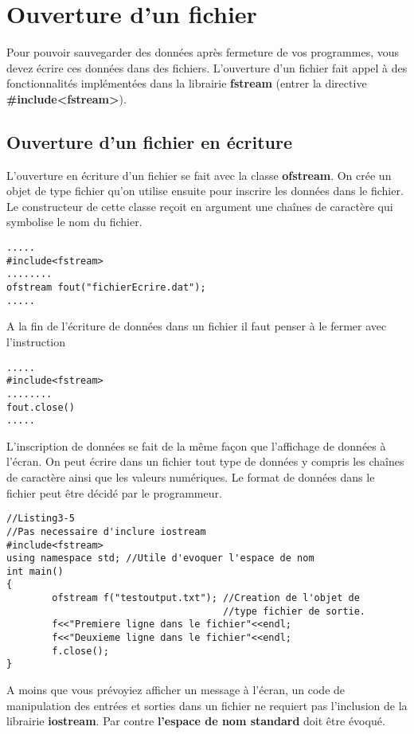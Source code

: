 \documentclass[a4paper, oneside,11pt]{book}
\begin{document}
\section{Ouverture d'un fichier}

Pour pouvoir sauvegarder des donn\'ees apr\`es fermeture de vos programmes, vous devez \'ecrire ces donn\'ees dans des fichiers. L'ouverture d'un fichier fait appel \`a des 
fonctionnalit\'es impl\'ement\'ees dans la librairie \textbf{fstream} (entrer la directive \textbf{\#include<fstream>}).

\subsection{Ouverture d'un fichier en \'ecriture}

L'ouverture  en \'ecriture d'un fichier se fait avec la classe \textbf{ofstream}. On cr\'ee un objet de type fichier qu'on utilise ensuite pour inscrire les donn\'ees dans le fichier.
Le constructeur de cette classe re\c{c}oit en argument une cha\^ines de caract\`ere qui symbolise le nom du fichier.
\begin{lstlisting}
.....
#include<fstream> 
........
ofstream fout("fichierEcrire.dat");
.....
\end{lstlisting}

A la fin de l'\'ecriture de donn\'ees dans un fichier il faut penser \`a le fermer avec l'instruction

\begin{lstlisting}
.....
#include<fstream> 
........
fout.close()
.....
\end{lstlisting}

L'inscription de donn\'ees se fait de la m\^eme fa\c{c}on que l'affichage de donn\'ees \`a l'\'ecran. On peut \'ecrire dans un fichier  tout type de donn\'ees y compris les cha\^ines
de caract\`ere ainsi que les valeurs num\'eriques. Le format de donn\'ees dans le fichier peut \^etre d\'ecid\'e par le programmeur. 

\begin{lstlisting}
//Listing3-5
//Pas necessaire d'inclure iostream
#include<fstream>
using namespace std; //Utile d'evoquer l'espace de nom
int main()
{
        ofstream f("testoutput.txt"); //Creation de l'objet de 
                                      //type fichier de sortie.
        f<<"Premiere ligne dans le fichier"<<endl;
        f<<"Deuxieme ligne dans le fichier"<<endl;
        f.close();
}
\end{lstlisting}
A moins que vous pr\'evoyiez afficher un message \`a l'\'ecran, un code de manipulation des entr\'ees et sorties dans un fichier ne requiert pas l'inclusion de la librairie
\textbf{iostream}. Par contre \textbf{l'espace de nom standard} doit \^etre \'evoqu\'e.
\end{document}
